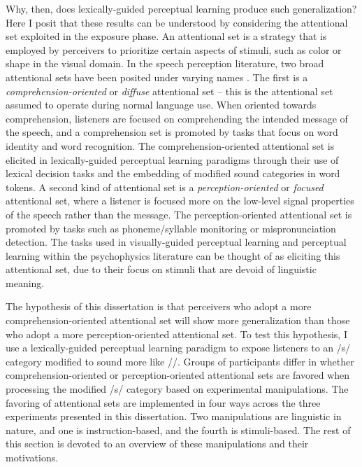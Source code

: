 Why, then, does lexically-guided perceptual learning produce such generalization?
Here I posit that these results can be understood by considering the attentional set exploited in the exposure phase.
An attentional set is a strategy that is employed by perceivers to prioritize certain aspects of stimuli, such as color or shape in the visual domain.
In the speech perception literature, two broad attentional sets have been posited under varying names \citep{Cutler1987, Pitt2012}.  
The first is a \emph{comprehension-oriented} or \emph{diffuse} attentional set -- this is the attentional set assumed to operate during normal language use.  
When oriented towards comprehension, listeners are focused on comprehending the intended message of the speech, and a comprehension set is promoted by tasks that focus on word identity and word recognition.
The comprehension-oriented attentional set is elicited in lexically-guided perceptual learning paradigms through their use of lexical decision tasks and the embedding of modified sound categories in word tokens. A second kind of attentional set is a \emph{perception-oriented} or \emph{focused} attentional set, where a listener is focused more on the low-level signal properties of the speech rather than the message.
The perception-oriented attentional set is promoted by tasks such as phoneme/syllable monitoring or mispronunciation detection.
The tasks used in visually-guided perceptual learning and perceptual learning within the psychophysics literature can be thought of as eliciting this attentional set, due to their focus on stimuli that are devoid of linguistic meaning.

The hypothesis of this dissertation is that perceivers who adopt a more comprehension-oriented attentional set will show more generalization than those who adopt a more perception-oriented attentional set.
To test this hypothesis, I use a lexically-guided perceptual learning paradigm to expose listeners to an /s/ category modified to sound more like /\textesh/.  
Groups of participants differ in whether comprehension-oriented or perception-oriented attentional sets are favored when processing the modified /s/ category based on experimental manipulations.
The favoring of attentional sets are implemented in four ways across the three experiments presented in this dissertation.  
Two manipulations are linguistic in nature, and one is instruction-based, and the fourth is stimuli-based.
The rest of this section is devoted to an overview of these manipulations and their motivations.

